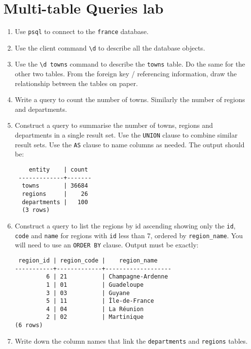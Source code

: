 \chapter{Multi-table Queries lab}

\begin{enumerate}

\item Use \texttt{psql} to connect to the \texttt{france} database.

\item Use the client command \texttt{\textbackslash d} to describe all the database objects.

\item Use the \texttt{\textbackslash d towns} command to describe the \texttt{towns} table.
  Do the same for the other two tables.
  From the foreign key / referencing information, draw the relationship between the tables on paper. 

\item Write a query to count the number of towns.
  Similarly the number of regions and departments. 
  
\item Construct a query to summarise the number of towns, regions and departments in a single result set.
  Use the \texttt{UNION} clause to combine similar result sets.
  Use the \texttt{AS} clause to name columns as needed.
  The output should be:
\begin{verbatim}
    entity    | count
 -------------+-------
  towns       | 36684
  regions     |    26
  departments |   100
  (3 rows)
\end{verbatim}

\item Construct a query to list the regions by id ascending showing only the \texttt{id}, \texttt{code} and \texttt{name} for regions with \texttt{id} less than 7, ordered by \texttt{region\_name}.
  You will need to use an \texttt{ORDER BY} clause.
  Output must be exactly:
\begin{verbatim}
 region_id | region_code |    region_name
-----------+-------------+-------------------
         6 | 21          | Champagne-Ardenne
         1 | 01          | Guadeloupe
         3 | 03          | Guyane
         5 | 11          | Île-de-France
         4 | 04          | La Réunion
         2 | 02          | Martinique
(6 rows)
\end{verbatim}
  \label{step:region-list}

\item Write down the column names that link the \texttt{departments} and \texttt{regions} tables.


\end{enumerate}
